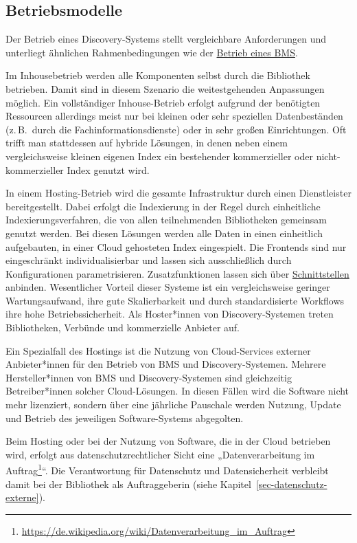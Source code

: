 \documentclass[
  11pt,
  letterpaper,
  DIV=11,
  twoside]{scrreprt}
\DeclareRobustCommand{\href}[2]{#2\footnote{\url{#1}}}
\begin{document}
\subsection{Betriebsmodelle}\label{betriebsmodelle}

Der Betrieb eines Discovery-Systems stellt vergleichbare Anforderungen
und unterliegt ähnlichen Rahmenbedingungen wie der
\hyperref[technischer-betrieb]{Betrieb eines BMS}.

Im Inhousebetrieb werden alle Komponenten selbst durch die Bibliothek
betrieben. Damit sind in diesem Szenario die weitestgehenden Anpassungen
möglich. Ein vollständiger Inhouse-Betrieb erfolgt aufgrund der
benötigten Ressourcen allerdings meist nur bei kleinen oder sehr
speziellen Datenbeständen (z.\,B.~durch die Fachinformationsdienste)
oder in sehr großen Einrichtungen. Oft trifft man stattdessen auf
hybride Lösungen, in denen neben einem vergleichsweise kleinen eigenen
Index ein bestehender kommerzieller oder nicht-kommerzieller Index
genutzt wird.

In einem Hosting-Betrieb wird die gesamte Infrastruktur durch einen
Dienstleister bereitgestellt. Dabei erfolgt die Indexierung in der Regel
durch einheitliche Indexierungsverfahren, die von allen teilnehmenden
Bibliotheken gemeinsam genutzt werden. Bei diesen Lösungen werden alle
Daten in einen einheitlich aufgebauten, in einer Cloud gehosteten Index
eingespielt. Die Frontends sind nur eingeschränkt individualisierbar und
lassen sich ausschließlich durch Konfigurationen parametrisieren.
Zusatzfunktionen lassen sich über
\hyperref[schnittstellen]{Schnittstellen} anbinden. Wesentlicher Vorteil
dieser Systeme ist ein vergleichsweise geringer Wartungsaufwand, ihre
gute Skalierbarkeit und durch standardisierte Workflows ihre hohe
Betriebssicherheit. Als Hoster*innen von Discovery-Systemen treten
Bibliotheken, Verbünde und kommerzielle Anbieter auf.

Ein Spezialfall des Hostings ist die Nutzung von Cloud-Services externer
Anbieter*innen für den Betrieb von BMS und Discovery-Systemen. Mehrere
Hersteller*innen von BMS und Discovery-Systemen sind gleichzeitig
Betreiber*innen solcher Cloud-Lösungen. In diesen Fällen wird die
Software nicht mehr lizenziert, sondern über eine jährliche Pauschale
werden Nutzung, Update und Betrieb des jeweiligen Software-Systems
abgegolten.

Beim Hosting oder bei der Nutzung von Software, die in der Cloud
betrieben wird, erfolgt aus datenschutzrechtlicher Sicht eine
„\href{https://de.wikipedia.org/wiki/Datenverarbeitung_im_Auftrag}{Datenverarbeitung
im Auftrag}``. Die Verantwortung für Datenschutz und Datensicherheit
verbleibt damit bei der Bibliothek als Auftraggeberin (siehe
Kapitel~\ref{sec-datenschutz-externe}).
\end{document}
